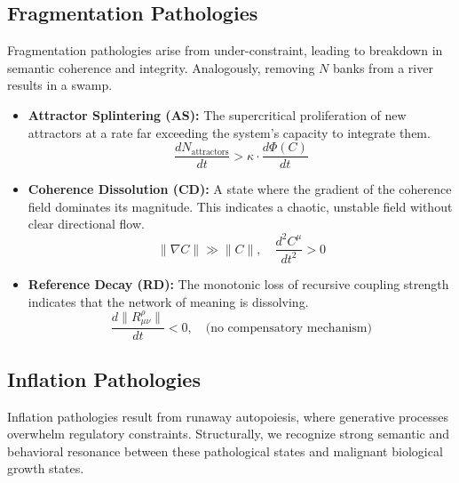 
\subsection{Fragmentation Pathologies}
\label{16.2.2:fragmentation_pathologies}

Fragmentation pathologies arise from under-constraint, leading to breakdown in semantic coherence and integrity. Analogously, removing \(N\) banks from a river results in a swamp.

\begin{itemize}
    
    \item \textbf{Attractor Splintering (AS):} The supercritical proliferation of new attractors at a rate far exceeding the system's capacity to integrate them.
    \begin{equation}
    \frac{dN_{\text{attractors}}}{dt} > \kappa \cdot \frac{d\Phi(C)}{dt}
    \end{equation}

    \item \textbf{Coherence Dissolution (CD):} A state where the gradient of the coherence field dominates its magnitude. This indicates a chaotic, unstable field without clear directional flow.
    \begin{equation}
    \|\nabla C\| \gg \|C\|, \quad \frac{d^2C^\mu}{dt^2} > 0
    \end{equation}

    \item \textbf{Reference Decay (RD):} The monotonic loss of recursive coupling strength indicates that the network of meaning is dissolving.
    \begin{equation}
    \frac{d\|R^\rho_{\mu\nu}\|}{dt} < 0, \quad \text{(no compensatory mechanism)}
    \end{equation}

\end{itemize}


\subsection{Inflation Pathologies}
\label{16.2.3:inflation_pathologies}

Inflation pathologies result from runaway autopoiesis, where generative processes overwhelm regulatory constraints. Structurally, we recognize strong semantic and behavioral resonance between these pathological states and malignant biological growth states.

